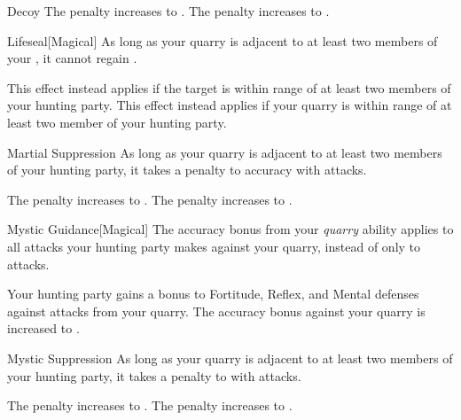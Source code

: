 {\begin{freeability}{Decoy}
                \rankline
                 The penalty increases to .
                 The penalty increases to .
            \end{freeability}

            \begin{freeability}{Lifeseal}[Magical]
                As long as your quarry is adjacent to at least two members of your , it cannot regain .

                \rankline
                 This effect instead applies if the target is within \rngmed range of at least two members of your hunting party.
                 This effect instead applies if your quarry is within \rnglong range of at least two member of your hunting party.
            \end{freeability}

            \begin{freeability}{Martial Suppression}
                As long as your quarry is adjacent to at least two members of your hunting party, it takes a  penalty to accuracy with  attacks.

                \rankline
                 The penalty increases to .
                 The penalty increases to .
            \end{freeability}

            \begin{freeability}{Mystic Guidance}[Magical]
                The accuracy bonus from your \textit{quarry} ability applies to all attacks your hunting party makes against your quarry, instead of only to  attacks.

                \rankline
                 Your hunting party gains a  bonus to Fortitude, Reflex, and Mental defenses against attacks from your quarry.
                 The accuracy bonus against your quarry is increased to .
            \end{freeability}

            \begin{freeability}{Mystic Suppression}
                As long as your quarry is adjacent to at least two members of your hunting party, it takes a  penalty to  with  attacks.

                \rankline
                 The penalty increases to . 
                 The penalty increases to .
            \end{freeability}

}
